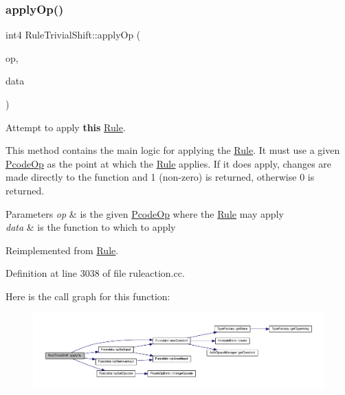 \subsubsection{\texorpdfstring{applyOp()}{applyOp()}}
{\footnotesize\ttfamily int4 Rule\+Trivial\+Shift\+::apply\+Op (\begin{DoxyParamCaption}\item[{\mbox{\hyperlink{class_pcode_op}{Pcode\+Op}} $\ast$}]{op,  }\item[{\mbox{\hyperlink{class_funcdata}{Funcdata}} \&}]{data }\end{DoxyParamCaption})\hspace{0.3cm}{\ttfamily [virtual]}}



Attempt to apply {\bfseries{this}} \mbox{\hyperlink{class_rule}{Rule}}. 

This method contains the main logic for applying the \mbox{\hyperlink{class_rule}{Rule}}. It must use a given \mbox{\hyperlink{class_pcode_op}{Pcode\+Op}} as the point at which the \mbox{\hyperlink{class_rule}{Rule}} applies. If it does apply, changes are made directly to the function and 1 (non-\/zero) is returned, otherwise 0 is returned. 
\begin{DoxyParams}{Parameters}
{\em op} & is the given \mbox{\hyperlink{class_pcode_op}{Pcode\+Op}} where the \mbox{\hyperlink{class_rule}{Rule}} may apply \\
\hline
{\em data} & is the function to which to apply \\
\hline
\end{DoxyParams}


Reimplemented from \mbox{\hyperlink{class_rule_a4e3e61f066670175009f60fb9dc60848}{Rule}}.



Definition at line 3038 of file ruleaction.\+cc.

Here is the call graph for this function\+:
\nopagebreak
\begin{figure}[H]
\begin{center}
\leavevmode
\includegraphics[width=350pt]{class_rule_trivial_shift_a373f11af57c1291eac63c4b69afde34a_cgraph}
\end{center}
\end{figure}
\mbox{\label{class_rule_trivial_shift_a9a7e9aacdba678db987601eb1c633662}} 
